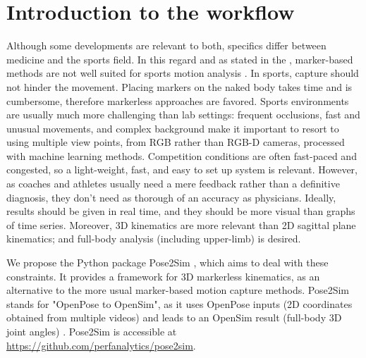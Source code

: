 \section{Introduction to the workflow}

Although some developments are relevant to both, specifics differ between medicine and the sports field. In this regard and as stated in the , marker-based methods are not well suited for sports motion analysis \cite{Colyer2018}. In sports, capture should not hinder the movement. Placing markers on the naked body takes time and is cumbersome, therefore markerless approaches are favored. Sports environments are usually much more challenging than lab settings: frequent occlusions, fast and unusual movements, and complex background make it important to resort to using multiple view points, from RGB rather than RGB-D cameras, processed with machine learning methods. Competition conditions are often fast-paced and congested, so a light-weight, fast, and easy to set up system is relevant. However, as coaches and athletes usually need a mere feedback rather than a definitive diagnosis, they don't need as thorough of an accuracy as physicians. Ideally, results should be given in real time, and they should be more visual than graphs of time series. Moreover, 3D kinematics are more relevant than 2D sagittal plane kinematics; and full-body analysis (including upper-limb) is desired.

We propose the Python package Pose2Sim \cite{Pagnon2022b}, which aims to deal with these constraints. It provides a framework for 3D markerless kinematics, as an alternative to the more usual marker-based motion capture methods. Pose2Sim stands for "OpenPose to OpenSim", as it uses OpenPose inputs (2D coordinates obtained from multiple videos) \cite{Cao2019} and leads to an OpenSim result (full-body 3D joint angles) \cite{Delp2007,Seth2018}. Pose2Sim is accessible at \url{https://github.com/perfanalytics/pose2sim}.

